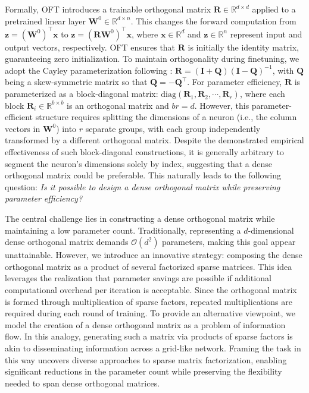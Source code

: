 Formally, OFT introduces a trainable orthogonal matrix $\bm{R}\in\mathbb{R}^{d\times d}$ applied to a pretrained linear layer $\bm{W}^0\in\mathbb{R}^{d\times n}$. This changes the forward computation from $\bm{z}=(\bm{W}^0)^\top\bm{x}$ to $\bm{z}=(\bm{R}\bm{W}^0)^\top\bm{x}$, where $\bm{x}\in\mathbb{R}^{d}$ and $\bm{z}\in\mathbb{R}^{n}$ represent input and output vectors, respectively. OFT ensures that $\bm{R}$ is initially the identity matrix, guaranteeing zero initialization. To maintain orthogonality during finetuning, we adopt the Cayley parameterization following \cite{qiu2023controlling,liu2021orthogonal}: $\bm{R}=(\bm{I}+\bm{Q})(\bm{I}-\bm{Q})^{-1}$, with $\bm{Q}$ being a skew-symmetric matrix so that $\bm{Q}=-\bm{Q}^\top$. For parameter efficiency, $\bm{R}$ is parameterized as a block-diagonal matrix: $\text{diag}(\bm{R}_1,\bm{R}_2,\cdots,\bm{R}_r)$, where each block $\bm{R}_i\in\mathbb{R}^{b\times b}$ is an orthogonal matrix and $br = d$. However, this parameter-efficient structure requires splitting the dimensions of a neuron (i.e., the column vectors in $\bm{W}^0$) into $r$ separate groups, with each group independently transformed by a different orthogonal matrix. Despite the demonstrated empirical effectiveness of such block-diagonal constructions, it is generally arbitrary to segment the neuron’s dimensions solely by index, suggesting that a dense orthogonal matrix could be preferable. This naturally leads to the following question: \emph{Is it possible to design a dense orthogonal matrix while preserving parameter efficiency?}

The central challenge lies in constructing a dense orthogonal matrix while maintaining a low parameter count. Traditionally, representing a $d$-dimensional dense orthogonal matrix demands $\mathcal{O}(d^2)$ parameters, making this goal appear unattainable. However, we introduce an innovative strategy: composing the dense orthogonal matrix as a product of several factorized sparse matrices. This idea leverages the realization that parameter savings are possible if additional computational overhead per iteration is acceptable. Since the orthogonal matrix is formed through multiplication of sparse factors, repeated multiplications are required during each round of training. To provide an alternative viewpoint, we model the creation of a dense orthogonal matrix as a problem of information flow. In this analogy, generating such a matrix via products of sparse factors is akin to disseminating information across a grid-like network. Framing the task in this way uncovers diverse approaches to sparse matrix factorization, enabling significant reductions in the parameter count while preserving the flexibility needed to span dense orthogonal matrices.

